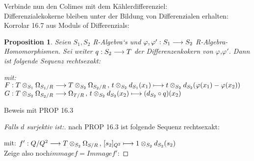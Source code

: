 \documentclass[10pt,a4paper]{report}
\newcounter{Aussage}[chapter]
\newtheorem{prop}[Aussage]{Proposition}
\newcommand{\functionfront}[3]{\nolinebreak{#1:#2 \longrightarrow #3}}
\newcommand{\function}[5]{\nolinebreak{#1:#2 \longrightarrow #3 \, , \, #4 \longmapsto #5}}
\newcommand{\divR}[2]{\Omega_{#1/#2}}
\newcommand{\tensor}[3]{#1 \otimes_{#2} #3}
\begin{document}
Verbinde nun den Colimes mit dem Kählerdifferenziel:\\
Differenzialekokerne bleiben unter der Bildung von Differenzialen erhalten:
Korrolar 16.7 aus Moduls of Differenzials:
\begin{prop}
Seien $S_1,S_2$ R-Algebra`s und $\functionfront{\varphi,\varphi'}{S_1}{S_2}$ R-Algebra-Homomorphismen. Sei weiter $\functionfront{q}{S_2}{T}$ der Differenzenkokern von $\varphi$,$\varphi '$.
Dann ist folgende Sequenz rechtsexakt:\\
\begin{center}
\end{center}
\begin{spacing}{1.5}
mit: $\function{F}{\tensor{T}{S_1}{\divR{S_1}{R}}}{\tensor{T}{S_2}{\divR{S_2}{R}}}{\tensor{t}{S_2}{d_{S_1}(x_1)}}{\tensor{t}{S_2}{d_{S_2}(\varphi(x_1) - \varphi(x_2))}}$\\
$\function{G}{\tensor{T}{S_2}{\divR{S_2}{R}}}{\divR{T}{R}}{\tensor{t}{S_2}{d_{S_2}(x_2)}}{(d_{S_2}\circ q)(x_2)}$
\end{spacing}
\end{prop}
Beweis mit PROP 16.3
\begin{proof}
[Falls $d$ surjektiv ist:] nach PROP 16.3 ist folgende Sequenz rechtsexakt:
\begin{center}
\end{center}
mit: $\function{f'}{Q/Q^2}{{\tensor{T}{S_2}{\divR{S}{R}}}}{[s_2]_{Q^2}}{\tensor{1}{S_2}{d_{S_2}(s_2)}}$\\
Zeige also noch$immage{f} = Immage{f'}$:

\end{proof}
\end{document}
